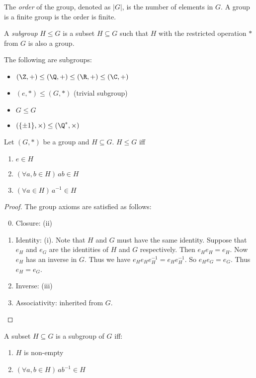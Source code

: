 \documentclass[a4paper]{article}
\begin{document}
\begin{defi}
  The \emph{order} of the group, denoted as $|G|$, is the number of elements in $G$. A group is a finite group is the order is finite.
\end{defi}
\begin{defi}[Subgroup]
  A \emph{subgroup} $H\leq G$ is a subset $H\subseteq G$ such that $H$ with the restricted operation $*$ from $G$ is also a group.
\end{defi}
\begin{eg}
  The following are subgroups:
  \begin{itemize}
    \item $(\Z, +)\leq (\Q, +) \leq (\R, +)\leq (\C, +)$
    \item $({e}, *) \leq (G, *)$ (trivial subgroup)
    \item $G \leq G$
    \item $(\{\pm 1\}, \times) \leq (\Q^*, \times)$
  \end{itemize}
\end{eg}
\begin{lemma}
  Let $(G, *)$ be a group and $H\subseteq G$. $H \leq G$ iff
  \begin{enumerate}
    \item $e \in H$
    \item $(\forall a, b\in H)\,ab \in H$
    \item $(\forall a \in H)\,a^{-1} \in H$
  \end{enumerate}
\end{lemma}
\begin{proof}
  The group axioms are satisfied as follows:
  \begin{enumerate}[label=\arabic{*}.]
      \setcounter{enumi}{-1}
    \item Closure: (ii)
    \item Identity: (i). Note that $H$ and $G$ must have the same identity. Suppose that $e_H$ and $e_G$ are the identities of $H$ and $G$ respectively. Then $e_He_H = e_H$. Now $e_H$ has an inverse in $G$. Thus we have $e_He_He_H^{-1} = e_He_H^{-1}$. So $e_He_G = e_G$. Thus $e_H = e_G$.
    \item Inverse: (iii)
    \item Associativity: inherited from $G$.
  \end{enumerate}
\end{proof}
\begin{lemma}
  A subset $H\subseteq G$ is a subgroup of $G$ iff:
  \begin{enumerate}[label=(\Roman{*})]
    \item $H$ is non-empty
    \item $(\forall a, b\in H)\,ab^{-1}\in H$
  \end{enumerate}
\end{lemma}
\end{document}
